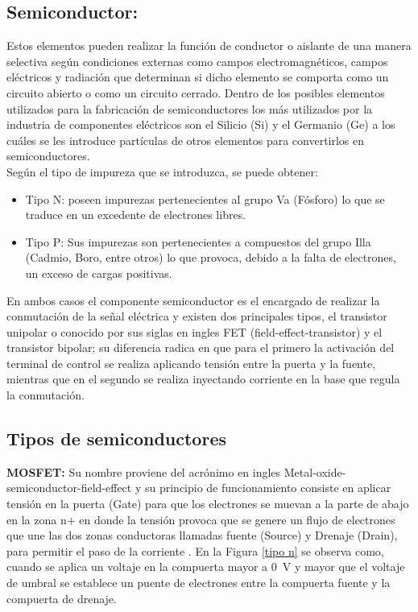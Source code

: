 \subsection{Semiconductor:}

Estos elementos pueden realizar la función de conductor o aislante de una manera selectiva según condiciones externas como campos electromagnéticos, campos eléctricos y radiación que determinan si dicho elemento se comporta como un circuito abierto o como un circuito cerrado. Dentro de los posibles elementos utilizados para la fabricación de semiconductores los más utilizados por la industria de componentes eléctricos son el Silicio (Si) y el Germanio (Ge) a los cuáles se les introduce partículas de otros elementos para convertirlos en semiconductores.\cite{beltran}
\\
Según el tipo de impureza que se introduzca, se puede obtener: 

\begin{itemize}
    \item Tipo N: poseen impurezas pertenecientes al grupo Va (Fósforo) lo que se traduce en un excedente de electrones libres.
    \item Tipo P: Sus impurezas son pertenecientes a compuestos del grupo Illa (Cadmio, Boro, entre otros) lo que provoca, debido a la falta de electrones, un exceso de cargas positivas.
\end{itemize}

En ambos casos el componente semiconductor es el encargado de realizar la conmutación de la señal eléctrica y existen dos principales tipos, el transistor unipolar o conocido por sus siglas en ingles FET (field-effect-transistor) y el transistor bipolar; su diferencia radica en que para el primero la activación del terminal de control se realiza aplicando tensión entre la puerta y la fuente, mientras que en el segundo se realiza inyectando corriente en la base que regula la conmutación.

\subsection{Tipos de semiconductores}

\textbf{MOSFET:} Su nombre proviene del acrónimo en ingles Metal-oxide-semiconductor-field-effect y su principio de funcionamiento consiste en aplicar tensión en la puerta (Gate) para que los electrones se muevan a la parte de abajo en la zona n+ en donde la tensión provoca que se genere un flujo de electrones que une las dos zonas conductoras llamadas fuente (Source) y Drenaje (Drain), para permitir el paso de la corriente \cite{beltran}. En la  Figura \ref{tipo n} se observa como, cuando se aplica un voltaje en la compuerta mayor a \SI{0}{\volt} y mayor que el voltaje de umbral se establece un puente de electrones entre la compuerta fuente y la compuerta de drenaje.

